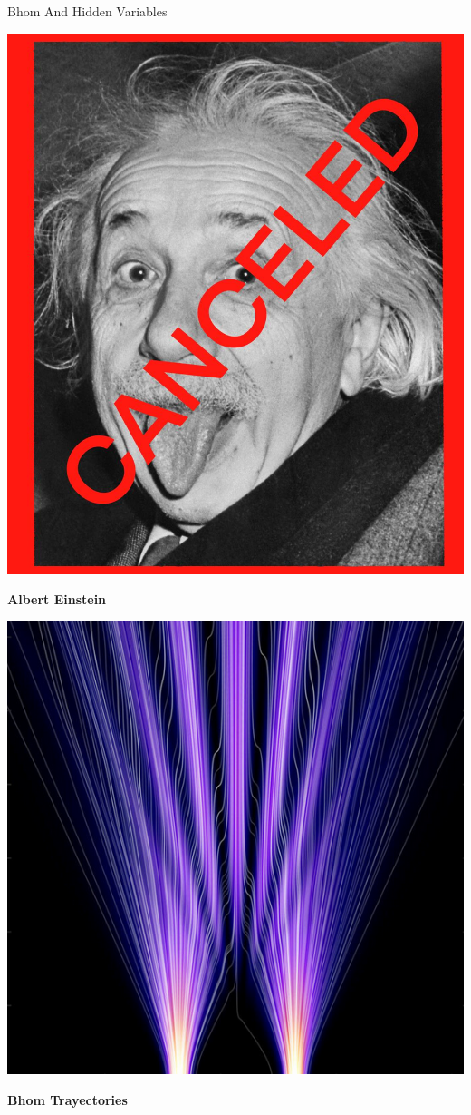 \begin{frame}{Bhom And Hidden Variables}
  \begin{minipage}{0.48\textwidth}
    \centering
    \includegraphics[width=0.8\linewidth]{figures/einstein.jpeg}
    \par\vspace{0.2cm}
    \textbf{Albert Einstein}
  \end{minipage}
  \hfill
  \begin{minipage}{0.48\textwidth}
    \centering
    \includegraphics[width=0.9\linewidth]{figures/Bhom.png}
    \par\vspace{0.2cm}
    \textbf{Bhom Trayectories}
  \end{minipage}
\end{frame}


